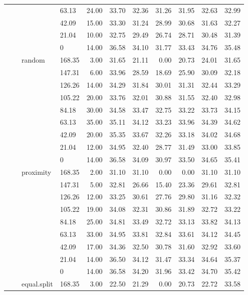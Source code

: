 \begin{longtable}{llllrrrrrrr}
   &  &  & 63.13 & 24.00 & 33.70 & 32.36 & 31.26 & 31.95 & 32.63 & 32.99 \\ 
   &  &  & 42.09 & 15.00 & 33.30 & 31.24 & 28.99 & 30.68 & 31.63 & 32.27 \\ 
   &  &  & 21.04 & 10.00 & 32.75 & 29.49 & 26.74 & 28.71 & 30.48 & 31.39 \\ 
   &  &  & 0 & 14.00 & 36.58 & 34.10 & 31.77 & 33.43 & 34.76 & 35.48 \\ 
   &  & random & 168.35 & 3.00 & 31.65 & 21.11 & 0.00 & 20.73 & 24.01 & 31.65 \\ 
   &  &  & 147.31 & 6.00 & 33.96 & 28.59 & 18.69 & 25.90 & 30.09 & 32.18 \\ 
   &  &  & 126.26 & 14.00 & 34.29 & 31.84 & 30.01 & 31.31 & 32.44 & 33.29 \\ 
   &  &  & 105.22 & 20.00 & 33.76 & 32.01 & 30.88 & 31.55 & 32.40 & 32.98 \\ 
   &  &  & 84.18 & 30.00 & 34.58 & 33.47 & 32.75 & 33.22 & 33.73 & 34.15 \\ 
   &  &  & 63.13 & 35.00 & 35.11 & 34.12 & 33.23 & 33.96 & 34.39 & 34.62 \\ 
   &  &  & 42.09 & 20.00 & 35.35 & 33.67 & 32.26 & 33.18 & 34.02 & 34.68 \\ 
   &  &  & 21.04 & 12.00 & 34.95 & 32.40 & 28.77 & 31.49 & 33.00 & 33.85 \\ 
   &  &  & 0 & 14.00 & 36.58 & 34.09 & 30.97 & 33.50 & 34.65 & 35.41 \\ 
   &  & proximity & 168.35 & 2.00 & 31.10 & 31.10 & 0.00 & 0.00 & 31.10 & 31.10 \\ 
   &  &  & 147.31 & 5.00 & 32.81 & 26.66 & 15.40 & 23.36 & 29.61 & 32.81 \\ 
   &  &  & 126.26 & 12.00 & 33.25 & 30.61 & 27.76 & 29.80 & 31.16 & 32.32 \\ 
   &  &  & 105.22 & 19.00 & 34.08 & 32.31 & 30.86 & 31.89 & 32.72 & 33.22 \\ 
   &  &  & 84.18 & 25.00 & 34.81 & 33.49 & 32.72 & 33.13 & 33.82 & 34.13 \\ 
   &  &  & 63.13 & 33.00 & 34.95 & 33.81 & 32.84 & 33.61 & 34.12 & 34.45 \\ 
   &  &  & 42.09 & 17.00 & 34.36 & 32.50 & 30.78 & 31.60 & 32.92 & 33.60 \\ 
   &  &  & 21.04 & 14.00 & 36.50 & 34.12 & 31.47 & 33.34 & 34.64 & 35.37 \\ 
   &  &  & 0 & 14.00 & 36.58 & 34.20 & 31.96 & 33.42 & 34.70 & 35.42 \\ 
   &  & equal.split & 168.35 & 3.00 & 22.50 & 21.29 & 0.00 & 20.73 & 22.72 & 33.58 \\ 

\end{longtable}
